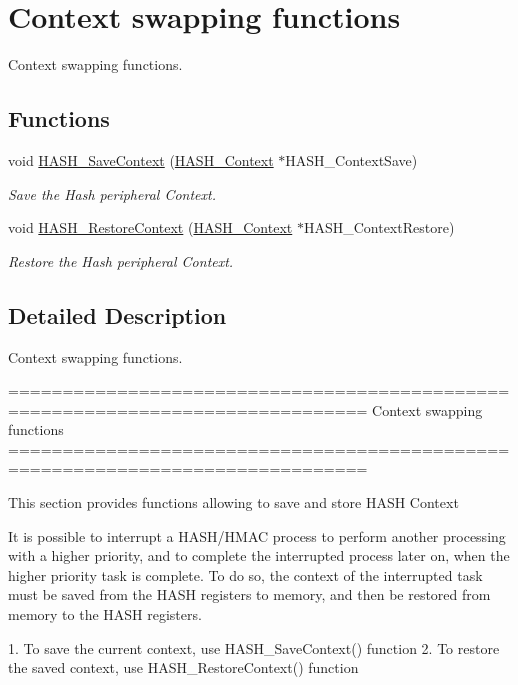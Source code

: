 \hypertarget{group___h_a_s_h___group3}{\section{Context swapping functions}
\label{group___h_a_s_h___group3}
}


Context swapping functions.  


\subsection*{Functions}
\begin{DoxyCompactItemize}
\item 
void \hyperlink{group___h_a_s_h___group3_ga9432b2b66e223414c840e9313c388bc5}{H\-A\-S\-H\-\_\-\-Save\-Context} (\hyperlink{struct_h_a_s_h___context}{H\-A\-S\-H\-\_\-\-Context} $\ast$H\-A\-S\-H\-\_\-\-Context\-Save)
\begin{DoxyCompactList}\small\item\em Save the Hash peripheral Context. \end{DoxyCompactList}\item 
void \hyperlink{group___h_a_s_h___group3_ga1d8412a13601376c968aec63212ca54e}{H\-A\-S\-H\-\_\-\-Restore\-Context} (\hyperlink{struct_h_a_s_h___context}{H\-A\-S\-H\-\_\-\-Context} $\ast$H\-A\-S\-H\-\_\-\-Context\-Restore)
\begin{DoxyCompactList}\small\item\em Restore the Hash peripheral Context. \end{DoxyCompactList}\end{DoxyCompactItemize}


\subsection{Detailed Description}
Context swapping functions. \begin{DoxyVerb} ===============================================================================
                             Context swapping functions
 ===============================================================================  

  This section provides functions allowing to save and store HASH Context
  
  It is possible to interrupt a HASH/HMAC process to perform another processing 
  with a higher priority, and to complete the interrupted process later on, when 
  the higher priority task is complete. To do so, the context of the interrupted 
  task must be saved from the HASH registers to memory, and then be restored 
  from memory to the HASH registers.
  
  1. To save the current context, use HASH_SaveContext() function
  2. To restore the saved context, use HASH_RestoreContext() function \end{DoxyVerb}
 

